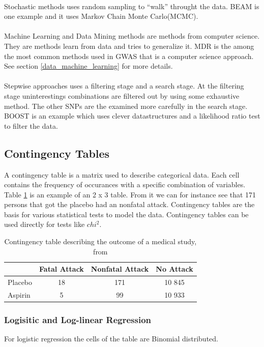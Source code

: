 \documentclass[10pt,a4paper]{article}
\begin{document}
\\
Stochastic methods uses random sampling to ``walk'' throught the data. BEAM\cite{beam_2007} is one example and it uses Markov Chain Monte Carlo(MCMC).\\
\\
Machine Learning and Data Mining methods are methods from computer science. They are methods learn from data and tries to generalize it. MDR\cite{mdr_2001} is the among the most common methods used in GWAS that is a computer science approach. See section \ref{data_machine_learning} for more details.\\
\\
Stepwise approaches uses a filtering stage and a search stage. At the filtering stage uninterestings combinations are filtered out by using some exhaustive method. The other SNPs are the examined more carefully in the search stage. BOOST\cite{boost_gene_gene} is an example which uses clever datastructures and a likelihood ratio test to filter the data.

\subsection{Contingency Tables}
A contingency table is a matrix used to describe categorical data. Each cell contains the frequency of occurances with a specific combination of variables. Table \ref{table:contingency_table} is an example of an 2 x 3 table. From it we can for instance see that 171 persons that got the placebo had an nonfatal attack. Contingency tables are the basis for various statistical tests to model the data. Contingency tables can be used directly for tests like $chi^2$.\cite{agresti_categorical}

\begin{table}[h]
\begin{tabular}{ l c c c }
  \hline
  & Fatal Attack & Nonfatal Attack & No Attack\\
  \hline
  Placebo & 18 & 171 & 10 845 \\
  Aspirin & 5 & 99 & 10 933 \\
  \hline  
\end{tabular}
\caption{Contingency table describing the outcome of a medical study, from \cite{agresti_categorical}}
\label{table:contingency_table}
\end{table}

\subsubsection{Logisitic and Log-linear Regression}
For logistic regression the cells of the table are Binomial distributed.\cite{agresti_categorical}
\end{document}
